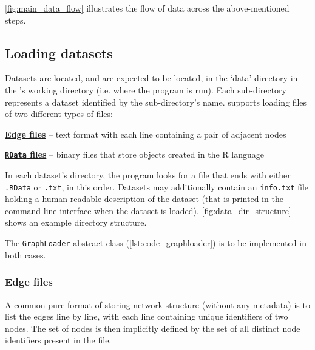 \autoref{fig:main_data_flow} illustrates the flow of data across the above-mentioned steps.

\subsection{Loading datasets}

Datasets are located, and are expected to be located, in the `data' directory in the \graffs's working directory (i.e. where the program is run).
Each sub-directory represents a dataset identified by the sub-directory's name.
\graffs supports loading files of two different types of files:

\begin{description}
    \item \hyperref[sec:edge_files]{\textbf{Edge files}} -- text format with each line containing a pair of adjacent nodes
    \item \hyperref[sec:rdata_files]{\textbf{\texttt{RData} files}} -- binary files that store objects created in the R language~\cite{RCoreTeamLanguageEnvironmentStatistical2009}
\end{description}



In each dataset's directory, the program looks for a file that ends with either \texttt{.RData} or \texttt{.txt}, in this order.
Datasets may additionally contain an \texttt{info.txt} file holding a human-readable description of the dataset (that is printed in the command-line interface when the dataset is loaded).
\autoref{fig:data_dir_structure} shows an example directory structure.

The \texttt{GraphLoader} abstract class (\autoref{lst:code_graphloader}) is to be implemented in both cases.


\subsubsection{Edge files}\label{sec:edge_files}

A common pure format of storing network structure (without any metadata) is to list the edges line by line, with each line containing unique identifiers of two nodes.
The set of nodes is then implicitly defined by the set of all distinct node identifiers present in the file.

